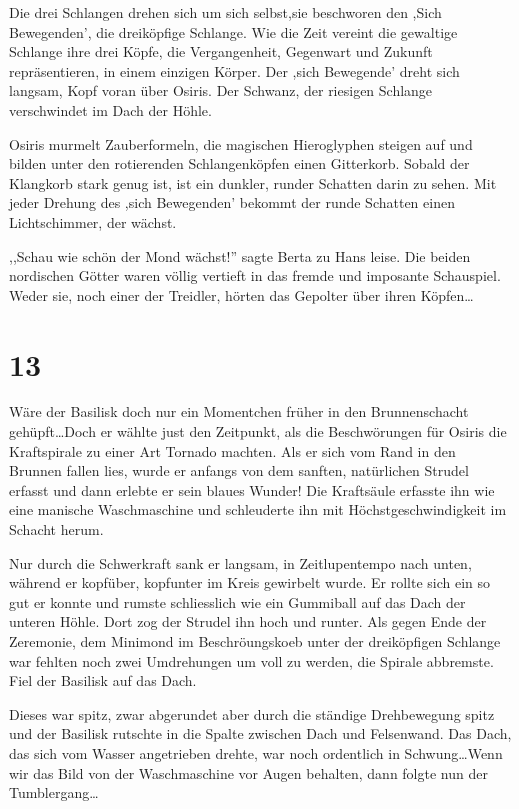 \documentclass[11pt,titlepage,a5paper]{book}
\begin{document}
Die drei Schlangen drehen sich um sich selbst,sie beschworen den ,Sich Bewegenden', die dreiköpfige Schlange. Wie die Zeit vereint die gewaltige Schlange ihre drei Köpfe, die Vergangenheit, Gegenwart und Zukunft repräsentieren, in einem einzigen Körper. Der ,sich Bewegende' dreht sich langsam, Kopf voran über Osiris. Der Schwanz, der riesigen Schlange verschwindet im Dach der Höhle. 

Osiris murmelt Zauberformeln, die magischen Hieroglyphen steigen auf und bilden unter den rotierenden Schlangenköpfen einen Gitterkorb. Sobald der Klangkorb stark genug ist, ist ein dunkler, runder Schatten darin zu sehen. Mit jeder Drehung des ,sich Bewegenden' bekommt der runde Schatten einen Lichtschimmer, der wächst.

,,Schau wie schön der Mond wächst!'' sagte Berta zu Hans leise. Die beiden nordischen Götter waren völlig vertieft in das fremde und imposante Schauspiel. Weder sie, noch einer der Treidler, hörten das Gepolter über ihren Köpfen\dots

\section*{13}

Wäre der Basilisk doch nur ein Momentchen früher in den Brunnenschacht gehüpft\dots Doch er wählte just den Zeitpunkt, als die Beschwörungen für Osiris die Kraftspirale zu einer Art Tornado machten. Als er sich vom Rand in den Brunnen fallen lies, wurde er anfangs von dem sanften, natürlichen Strudel erfasst und dann erlebte er sein blaues Wunder! Die Kraftsäule erfasste ihn wie eine manische Waschmaschine und schleuderte ihn mit Höchstgeschwindigkeit im Schacht herum. 

Nur durch die Schwerkraft sank er langsam, in Zeitlupentempo nach unten, während er kopfüber, kopfunter im Kreis gewirbelt wurde. Er rollte sich ein so gut er konnte und rumste schliesslich wie ein Gummiball auf das Dach der unteren Höhle. Dort zog der Strudel ihn hoch und runter. Als gegen Ende der Zeremonie, dem Minimond im Beschröungskoeb unter der dreiköpfigen Schlange war fehlten noch zwei Umdrehungen um voll zu werden, die Spirale abbremste. Fiel der Basilisk auf das Dach.

Dieses war spitz, zwar abgerundet aber durch die ständige Drehbewegung spitz und der Basilisk rutschte in die Spalte zwischen Dach und Felsenwand. Das Dach, das sich vom Wasser angetrieben drehte, war noch ordentlich in Schwung\dots Wenn wir das Bild von der Waschmaschine vor Augen behalten, dann folgte nun der Tumblergang\dots
\end{document}
